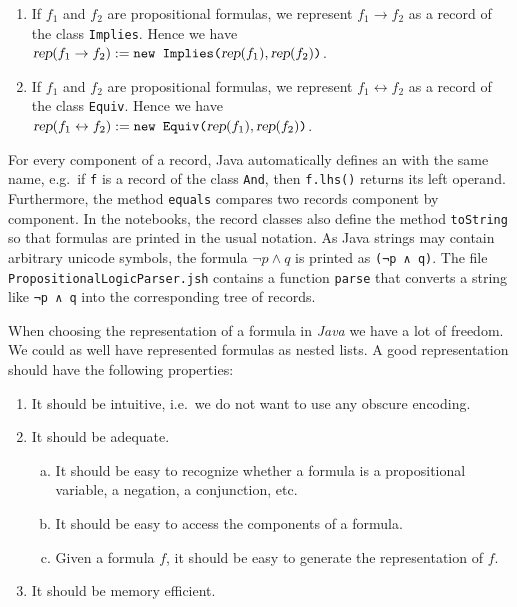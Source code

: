 \begin{enumerate}
      \hspace*{1.3cm} 
      $\textsl{rep}(f_1 \vee f_2) := \texttt{new Or(}\textsl{rep}(f_1), \textsl{rep}(f_2)\texttt{)}$.
\item If $f_1$ and $f_2$ are propositional formulas, we represent $f_1 \rightarrow f_2$ as a record of the class
      \texttt{Implies}.  Hence we have
      \\[0.2cm]
      \hspace*{1.3cm} 
      $\textsl{rep}(f_1 \rightarrow f_2) := \texttt{new Implies(}\textsl{rep}(f_1), \textsl{rep}(f_2)\texttt{)}$.
\item If $f_1$ and $f_2$ are propositional formulas, we represent $f_1 \leftrightarrow f_2$ as a record of the class
      \texttt{Equiv}.  Hence we have
      \\[0.2cm]
      \hspace*{1.3cm} 
      $\textsl{rep}(f_1 \leftrightarrow f_2) := \texttt{new Equiv(}\textsl{rep}(f_1), \textsl{rep}(f_2)\texttt{)}$.
\end{enumerate}
For every component of a record, Java automatically defines an  with the same name, e.g.~if
\texttt{f} is a record of the class \texttt{And}, then \texttt{f.lhs()} returns its left operand.  Furthermore,
the method \texttt{equals} compares two records component by component.  In the notebooks, the record classes also
define the method \texttt{toString} so that formulas are printed in the usual notation.  As Java strings may
contain arbitrary unicode symbols, the formula $\neg p \wedge q$ is printed as \texttt{(¬p ∧ q)}.  The file
\texttt{PropositionalLogicParser.jsh} contains a function \texttt{parse} that converts a string like
\texttt{¬p ∧ q} into the corresponding tree of records.

When choosing the representation of a formula in \textsl{Java} we have a lot of freedom.
We could as well have represented formulas as nested lists.  A good representation should have
the following properties:
\begin{enumerate}
\item It should be intuitive, i.e.~we do not want to use any obscure encoding.
\item It should be adequate.
  \begin{enumerate}[(a)]
  \item It should be easy to recognize whether a formula is a propositional variable, a negation, a
        conjunction, etc.
  \item It should be easy to access the components of a formula.
  \item Given a formula $f$, it should be easy to generate the representation of $f$.
  \end{enumerate}
\item It should be memory efficient.
\end{enumerate}

